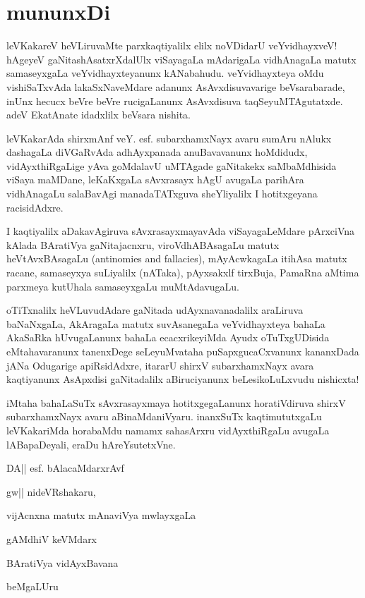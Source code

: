 \chapter*{mununxDi}

leVKakareV heVLiruvaMte parxkaqtiyalilx elilx noVDidarU veYvidhayxveV! hAgeyeV gaNitashAsatxrXdalUlx viSayagaLa mAdarigaLa vidhAnagaLa matutx samaseyxgaLa veYvidhayxteyanunx kANabahudu. veYvidhayxteya oMdu vishiSaTxvAda lakaSxNaveMdare adanunx AsAvxdisuvavarige beVsarabarade, inUnx hecucx beVre beVre rucigaLanunx AsAvxdisuva taqSeyuMTAgutatxde. adeV EkatAnate idadxlilx beVsara nishita.

leVKakarAda shirxmAnf veY. esf. subarxhamxNayx avaru sumAru nAlukx dashagaLa diVGaRvAda adhAyxpanada anuBavavanunx hoMdidudx, vidAyxthiRgaLige yAva goMdalavU uMTAgade gaNitakekx saMbaMdhisida viSaya maMDane, leKaKxgaLa sAvxrasayx hAgU avugaLa parihAra vidhAnagaLu salaBavAgi manadaTATxguva sheYliyalilx I hotitxgeyana racisidAdxre.

I kaqtiyalilx aDakavAgiruva sAvxrasayxmayavAda viSayagaLeMdare pArxciVna kAlada BAratiVya gaNitajacnxru, viroVdhABAsagaLu matutx heVtAvxBAsagaLu {\rm (antinomies and fallacies)}, mAyAcwkagaLa itihAsa matutx racane, samaseyxya suLiyalilx (nATaka), pAyxsakxlf tirxBuja, PamaRna aMtima parxmeya kutUhala samaseyxgaLu muMtAdavugaLu.

oTiTxnalilx heVLuvudAdare gaNitada udAyxnavanadalilx araLiruva baNaNxgaLa, AkAragaLa matutx suvAsanegaLa veYvidhayxteya bahaLa AkaSaRka hUvugaLanunx bahaLa ecacxrikeyiMda Ayudx oTuTxgUDisida eMtahavaranunx tanenxDege seLeyuMvataha puSapxgucaCxvanunx kananxDada jANa Odugarige apiRsidAdxre, itararU shirxV subarxhamxNayx avara kaqtiyanunx AsApxdisi gaNitadalilx aBiruciyanunx beLesikoLuLxvudu nishicxta! 

iMtaha bahaLaSuTx sAvxrasayxmaya hotitxgegaLanunx horatiVdiruva shirxV subarxhamxNayx avaru aBinaMdaniVyaru. inanxSuTx kaqtimututxgaLu leVKakariMda horabaMdu namamx sahasArxru vidAyxthiRgaLu avugaLa lABapaDeyali, eraDu hAreYsutetxVne.

\medskip

\hfill{DA|| esf. bAlacaMdarxrAvf}

gw|| nideVRshakaru,

vijAcnxna matutx mAnaviVya mwlayxgaLa

gAMdhiV keVMdarx

BAratiVya vidAyxBavana

beMgaLUru 

